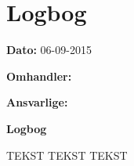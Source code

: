 \chapter{Logbog}

\textbf{Dato:} 06-09-2015

\textbf{Omhandler:}

\textbf{Ansvarlige:}

\textbf{Logbog}

TEKST TEKST TEKST
